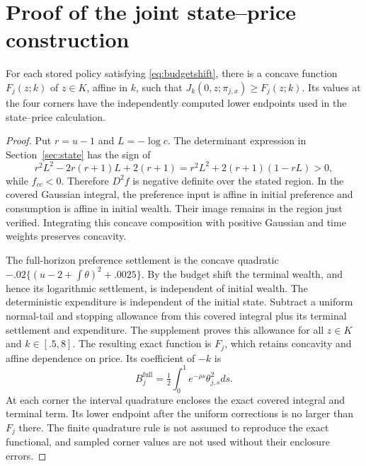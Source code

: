 \section{Proof of the joint state--price construction}\label{app:stateprice}
\begin{lemma}\label{lem:concavity}
For each stored policy satisfying \eqref{eq:budgetshift}, there is a concave function $F_j(z;k)$ of $z\in K$, affine in $k$, such that $J_k(0,z;\pi_{j,x})\geq F_j(z;k)$. Its values at the four corners have the independently computed lower endpoints used in the state--price calculation.
\end{lemma}
\begin{proof}
Put $r=u-1$ and $L=-\log c$. The determinant expression in Section~\ref{sec:state} has the sign of
\[
 r^2L^2-2r(r+1)L+2(r+1)
   =r^2L^2+2(r+1)(1-rL)>0,
\]
while $f_{cc}<0$. Therefore $D^2 f$ is negative definite over the stated region. In the covered Gaussian integral, the preference input is affine in initial preference and consumption is affine in initial wealth. Their image remains in the region just verified. Integrating this concave composition with positive Gaussian and time weights preserves concavity.

The full-horizon preference settlement is the concave quadratic
$-.02\{(u-2+\int\theta)^2+.0025\}$. By the budget shift the terminal wealth, and hence its logarithmic settlement, is independent of initial wealth. The deterministic expenditure is independent of the initial state. Subtract a uniform normal-tail and stopping allowance from this covered integral plus its terminal settlement and expenditure. The supplement proves this allowance for all $z\in K$ and $k\in[.5,8]$. The resulting exact function is $F_j$, which retains concavity and affine dependence on price. Its coefficient of $-k$ is
\[
 B_j^{\mathrm{full}}=\tfrac12\int_0^1e^{-\rho s}\theta_{j,s}^2ds.
\]
At each corner the interval quadrature encloses the exact covered integral and terminal term. Its lower endpoint after the uniform corrections is no larger than $F_j$ there. The finite quadrature rule is not assumed to reproduce the exact functional, and sampled corner values are not used without their enclosure errors.
\end{proof}

